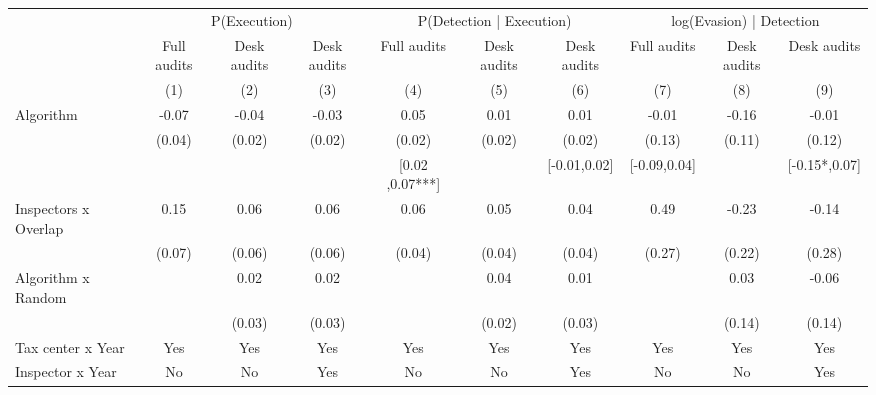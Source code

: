 \begin{tabular}{lccc|ccc|ccc} \toprule
\multicolumn{1}{l}{} & \multicolumn{3}{c}{P(Execution)} & \multicolumn{3}{c}{P(Detection | Execution)} & \multicolumn{3}{c}{log(Evasion) | Detection} \\\cmidrule(lr){2-4}\cmidrule(lr){5-7}\cmidrule(lr){8-10} \multicolumn{1}{l}{} & Full audits & Desk audits & Desk audits & Full audits & Desk audits & Desk audits & Full audits & Desk audits & Desk audits \\ \multicolumn{1}{l}{} & (1) & (2) & (3) & (4) & (5) & (6) & (7) & (8) & (9) \\ \midrule
Algorithm   &       -0.07\sym{**} &       -0.04         &       -0.03         &        0.05\sym{***}&        0.01         &        0.01         &       -0.01         &       -0.16         &       -0.01         \\
            &      (0.04)         &      (0.02)         &      (0.02)         &      (0.02)         &      (0.02)         &      (0.02)         &      (0.13)         &      (0.11)         &      (0.12)         \\
\addlinespace
 & & & & [0.02 ,0.07***] & & [-0.01,0.02] & [-0.09,0.04] & & [-0.15*,0.07] \\  Inspectors x Overlap&        0.15\sym{**} &        0.06         &        0.06         &        0.06\sym{*}  &        0.05         &        0.04         &        0.49\sym{*}  &       -0.23         &       -0.14         \\
            &      (0.07)         &      (0.06)         &      (0.06)         &      (0.04)         &      (0.04)         &      (0.04)         &      (0.27)         &      (0.22)         &      (0.28)         \\
\addlinespace
Algorithm x Random&                     &        0.02         &        0.02         &                     &        0.04\sym{*}  &        0.01         &                     &        0.03         &       -0.06         \\
            &                     &      (0.03)         &      (0.03)         &                     &      (0.02)         &      (0.03)         &                     &      (0.14)         &      (0.14)         \\
\midrule
Tax center x Year&         Yes         &         Yes         &         Yes         &         Yes         &         Yes         &         Yes         &         Yes         &         Yes         &         Yes         \\
Inspector x Year&          No         &          No         &         Yes         &          No         &          No         &         Yes         &          No         &          No         &         Yes         \\

\end{tabular}
